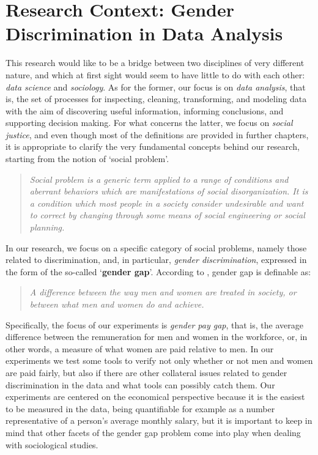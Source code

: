\section{Research Context: Gender Discrimination in Data Analysis}
This research would like to be a bridge between two disciplines of very different nature, and which at first sight would seem to have little to do with each other: \textit{data science} and \textit{sociology}. As for the former, our focus is on \textit{data analysis}, that is, the set of processes for inspecting, cleaning, transforming, and modeling data with the aim of discovering useful information, informing conclusions, and supporting decision making. For what concerns the latter, we focus on \textit{social justice}, and even though most of the definitions are provided in further chapters, it is appropriate to clarify the very fundamental concepts behind our research, starting from the notion of `social problem'.
\begin{quote}\emph{Social problem is a generic term applied to a range of conditions and aberrant behaviors which are manifestations of social disorganization. It is a condition which most people in a society consider undesirable and want to correct by changing through some means of social engineering or social planning.} \cite{marshall1998oxford}\end{quote}

In our research, we focus on a specific category of social problems, namely those related to discrimination, and, in particular, \textit{gender discrimination}, expressed in the form of the so-called `\textbf{gender gap}'. According to \cite{cambridge2013gender}, gender gap is definable as:
\begin{quote}\emph{A difference between the way men and women are treated in society, or between what men and women do and achieve.} \cite{cambridge2013gender}\end{quote}

Specifically, the focus of our experiments is \textit{gender pay gap}, that is, the average difference between the remuneration for men and women in the workforce, or, in other words, a measure of what women are paid relative to men. In our experiments we test some tools to verify not only whether or not men and women are paid fairly, but also if there are other collateral issues related to gender discrimination in the data and what tools can possibly catch them.
Our experiments are centered on the economical perspective because it is the easiest to be measured in the data, being quantifiable for example as a number representative of a person's average monthly salary, but it is important to keep in mind that other facets of the gender gap problem come into play when dealing with sociological studies.

